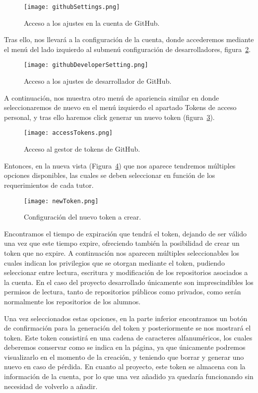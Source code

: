 \begin{figure}[h!]
  \texttt{[image: githubSettings.png]}
  \caption{Acceso a los ajustes en la cuenta de GitHub.}
  \label{figure:settingsGitHub}
\end{figure}

Tras ello, nos llevará a la configuración de la cuenta, donde accederemos
mediante el menú del lado izquierdo al submenú configuración de
desarrolladores, figura~\ref{figure:developerSettings}.

\begin{figure}[h!]
  \texttt{[image: githubDeveloperSetting.png]}
  \caption{Acceso a los ajustes de desarrollador de GitHub.}
  \label{figure:developerSettings}
\end{figure}

A continuación, nos muestra otro menú de apariencia similar en donde
seleccionaremos de nuevo en el menú izquierdo el apartado Tokens de acceso
personal, y tras ello haremos click generar un nuevo token
(figura~\ref{figure:tokensGitHub}).

\begin{figure}[h!]
  \texttt{[image: accessTokens.png]}
  \caption{Acceso al gestor de tokens de GitHub.}
  \label{figure:tokensGitHub}
\end{figure}

Entonces, en la nueva vista (Figura~\ref{figure:configToken}) que nos
aparece tendremos múltiples opciones disponibles, las cuales se deben
seleccionar en función de los requerimientos de cada tutor.

\begin{figure}[h!]
  \texttt{[image: newToken.png]}
  \caption{Configuración del nuevo token a crear.}
  \label{figure:configToken}
\end{figure}

Encontramos el tiempo de expiración que tendrá el token, dejando de ser
válido una vez que este tiempo expire, ofreciendo también la posibilidad de
crear un token que no expire. A continuación nos aparecen múltiples
seleccionables los cuales indican los privilegios que se otorgan mediante
el token, pudiendo seleccionar entre lectura, escritura y modificación de
los repositorios asociados a la cuenta. En el caso del proyecto
desarrollado únicamente son imprescindibles los permisos de lectura, tanto
de repositorios públicos como privados, como serán normalmente los
repositorios de los alumnos.

Una vez seleccionados estas opciones, en la parte inferior encontramos un
botón de confirmación para la generación del token y posteriormente se nos
mostrará el token. Este token consistirá en una cadena de caracteres
alfanuméricos, los cuales deberemos conservar como se indica en la página,
ya que únicamente podremos visualizarlo en el momento de la creación, y
teniendo que borrar y generar uno nuevo en caso de pérdida. En cuanto al
proyecto, este token se almacena con la información de la cuenta, por lo
que una vez añadido ya quedaría funcionando sin necesidad de volverlo a
añadir.

